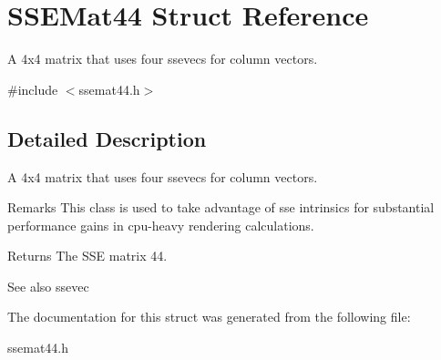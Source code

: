 \hypertarget{struct_s_s_e_mat44}{}\section{S\+S\+E\+Mat44 Struct Reference}
\label{struct_s_s_e_mat44}


A 4x4 matrix that uses four ssevecs for column vectors.  




{\ttfamily \#include $<$ssemat44.\+h$>$}



\subsection{Detailed Description}
A 4x4 matrix that uses four ssevecs for column vectors. 

\begin{DoxyRemark}{Remarks}
This class is used to take advantage of sse intrinsics for substantial performance gains in cpu-\/heavy rendering calculations.
\end{DoxyRemark}
\begin{DoxyReturn}{Returns}
The S\+S\+E matrix 44.
\end{DoxyReturn}
\begin{DoxySeeAlso}{See also}
ssevec 
\end{DoxySeeAlso}


The documentation for this struct was generated from the following file\+:\begin{DoxyCompactItemize}
\item 
ssemat44.\+h\end{DoxyCompactItemize}
